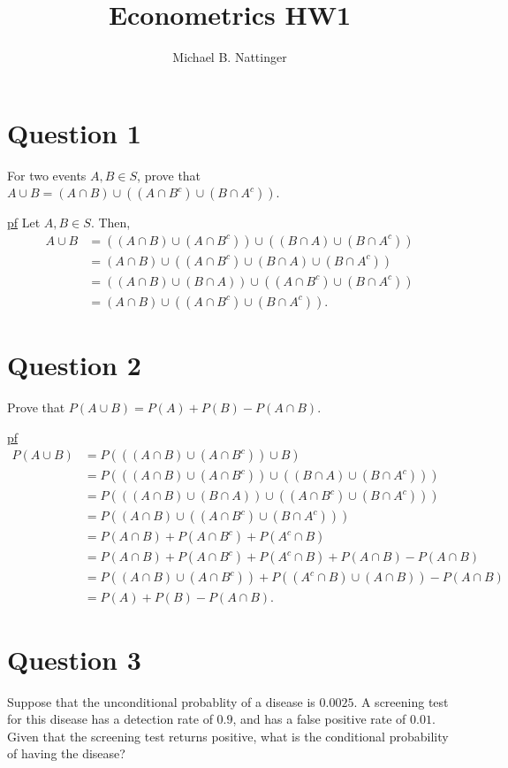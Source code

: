 \documentclass[11pt]{article} %
\title{Econometrics HW1}
\author{Michael B. Nattinger}
\begin{document}
\maketitle

\section{Question 1}
For two events $A,B \in S$, prove that $A \cup B = (A \cap B) \cup ((A \cap B^{c}) \cup (B \cap A^{c}))$.

\underline{pf} Let $A,B \in S.$ Then, 
\begin{align*}
A \cup B &= \left((A \cap B) \cup (A \cap B^{c}) \right) \cup \left( (B \cap A) \cup (B \cap A^{c}) \right)\\
	     &= (A \cap B) \cup \left( (A \cap B^{c}) \cup (B \cap A) \cup (B \cap A^{c}) \right) \\
	     &= \left( (A \cap B) \cup  (B \cap A) \right) \cup \left( (A \cap B^{c}) \cup (B \cap A^{c}) \right)\\
	     &= (A \cap B) \cup \left( (A \cap B^{c}) \cup (B \cap A^{c}) \right).
\end{align*}

\section{Question 2}
Prove that $P(A \cup B) = P(A) + P(B) - P(A \cap B).$

\underline{pf} 
\begin{align*}
P(A \cup B) &= P(( (A \cap B) \cup (A \cap B^{c})) \cup B) \\
 		 &= P(( (A \cap B) \cup (A \cap B^{c})) \cup ((B \cap A) \cup ( B \cap A^{c}))) \\
		 &= P(((A \cap B) \cup (B \cap A)) \cup ( (A \cap B^{c}) \cup (B \cap A^{c}))) \\
		 &= P((A \cap B) \cup ((A \cap B^{c}) \cup (B \cap A^{c}))) \\
		 &= P(A \cap B)+P(A \cap B^{c})+P(A^{c} \cap B) \\
		 &= P(A \cap B)+P(A \cap B^{c})+P(A^{c} \cap B) + P(A \cap B) - P(A \cap B) \\
		 &= P((A \cap B) \cup (A \cap B^{c}))+P((A^{c} \cap B) \cup (A \cap B)) - P(A \cap B) \\
		 &= P(A)+P(B) - P(A \cap B).
\end{align*}

\section{Question 3}
Suppose that the unconditional probablity of a disease is $0.0025$. A screening test for this disease has a detection rate of $0.9$, and has a false positive rate of $0.01$. Given that the screening test returns positive, what is the conditional probability of having the disease?
\end{document}
